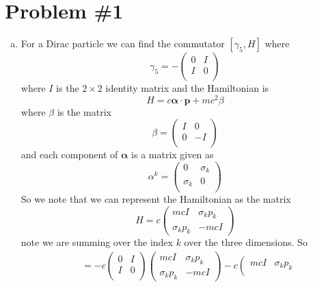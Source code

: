 \documentclass[11pt]{article}
\numberwithin{equation}{section}
\begin{document}


\section{Problem \#1}
\begin{enumerate}[(a)]
\item For a Dirac particle we can find the commutator $[\gamma_5,H]$ where
$$\gamma_5 = -\left(\begin{array}{cc}
                   0    &I\\
                   I    &0\\
               \end{array}\right)$$
where $I$ is the $2\times2$ identity matrix and the Hamiltonian is
$$H = c\pmb{\alpha}\cdot\mathbf{p} + mc^2\beta$$
where $\beta$ is the matrix
$$\beta = \left(\begin{array}{cc}
                   I    &0\\
                   0    &-I\\
               \end{array}\right)$$
and each component of $\pmb{\alpha}$ is a matrix given as
$$\alpha^{k} = \left(\begin{array}{cc}
                   0    &\sigma_k\\
                   \sigma_k    &0\\
               \end{array}\right)$$
So we note that we can represent the Hamiltonian as the matrix
$$H = c\left(\begin{array}{cc}
       mcI         &\sigma_kp_k\\
       \sigma_kp_k &-mcI
        \end{array}\right)$$
note we are summing over the index $k$ over the three dimensions. So
\begin{align*}
[\gamma_5,H] &= -c\left(\begin{array}{cc}
                   0    &I\\
                   I    &0\\
               \end{array}\right)
\left(\begin{array}{cc}
       mcI         &\sigma_kp_k\\
       \sigma_kp_k &-mcI
        \end{array}\right)
-c\left(\begin{array}{cc}
       mcI         &\sigma_kp_k\\

\end{array}
\end{align*}
\end{enumerate}
\end{document}

